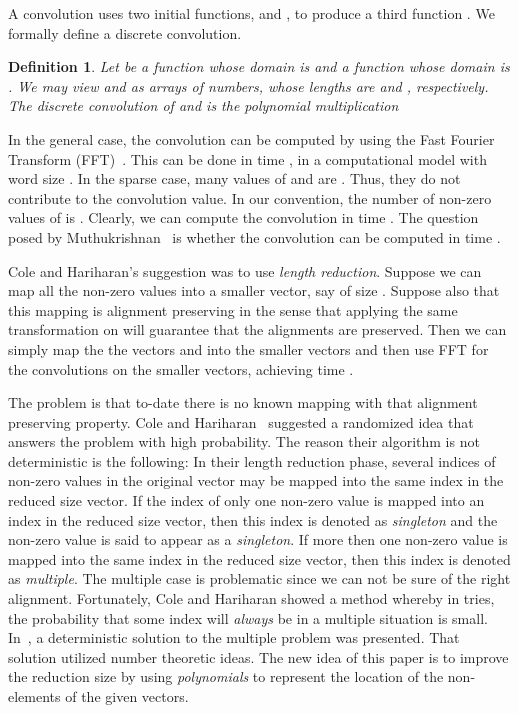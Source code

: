 \documentclass[11pt,amssymb]{article}
\newtheorem{definition}{Definition}
\begin{document}
A convolution uses two initial functions,  and , to
produce a third function . We formally define a discrete
convolution.
\begin{definition}
Let  be a function whose domain is  and 
a function whose domain is . We may view  and
 as arrays of numbers, whose lengths are  and ,
respectively. The {\em discrete convolution of  and } is the
polynomial multiplication

\end{definition}

In the general case, the convolution can be computed by using the Fast
Fourier Transform (FFT)~\cite{CLR-92}. This can be done in time
, in a computational model with word size . In the sparse case, many values of  and  are
. Thus, they do not contribute to the convolution value. In our
convention, the number of non-zero values of  is . Clearly, we can compute the convolution in time
. The question posed by Muthukrishnan~\cite{muthu-open} is
whether the convolution can be computed in time .

Cole and Hariharan's suggestion was to use {\em length reduction}.
Suppose we can map all the non-zero values into a smaller vector, say
of size . Suppose also that this mapping is alignment
preserving in the sense that applying the same transformation on 
will guarantee that the alignments are preserved. Then we can simply
map the the vectors  and  into the smaller vectors and then
use FFT for the convolutions on the smaller vectors, achieving time
.

The problem is that to-date there is no known mapping with that
alignment preserving property. Cole and Hariharan~\cite{CH:02}
suggested a randomized idea that answers the problem with high
probability. The reason their algorithm is not deterministic is the
following:
In their length reduction phase, several indices of
non-zero values in the original vector may be mapped into the same
index in the reduced size vector. If the index of only one non-zero
value is mapped into an index in the reduced size vector, then this
index is denoted as {\it singleton} and the non-zero value is said
to appear as a {\it singleton}. If more then one non-zero value is
mapped into the same index in the reduced size vector, then this
index is denoted as {\it multiple}. The multiple case is problematic
since we can not be sure of the right alignment. Fortunately, Cole
and Hariharan showed a method whereby in  tries, the
probability that some index will {\em always} be in a multiple
situation is small. In~\cite{LR07}, a deterministic solution to the
multiple problem was presented. That solution utilized number
theoretic ideas. The new idea of this paper is to improve the
reduction size by using {\em polynomials} to represent the location of
the non- elements of the given vectors.
\end{document}
